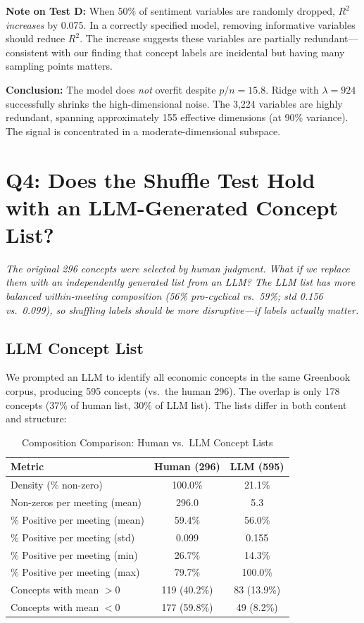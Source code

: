 \documentclass[11pt,a4paper]{article}
\begin{document}
\textbf{Note on Test D:} When 50\% of sentiment variables are randomly dropped, $R^2$ \textit{increases} by 0.075. In a correctly specified model, removing informative variables should reduce $R^2$. The increase suggests these variables are partially redundant---consistent with our finding that concept labels are incidental but having many sampling points matters.

\textbf{Conclusion:} The model does \textit{not} overfit despite $p/n = 15.8$. Ridge with $\lambda = 924$ successfully shrinks the high-dimensional noise. The 3,224 variables are highly redundant, spanning approximately 155 effective dimensions (at 90\% variance). The signal is concentrated in a moderate-dimensional subspace.

\section*{Q4: Does the Shuffle Test Hold with an LLM-Generated Concept List?}

\textit{The original 296 concepts were selected by human judgment. What if we replace them with an independently generated list from an LLM? The LLM list has more balanced within-meeting composition (56\% pro-cyclical vs.\ 59\%; std 0.156 vs.\ 0.099), so shuffling labels should be more disruptive---if labels actually matter.}

\subsection*{LLM Concept List}

We prompted an LLM to identify all economic concepts in the same Greenbook corpus, producing 595 concepts (vs.\ the human 296). The overlap is only 178 concepts (37\% of human list, 30\% of LLM list). The lists differ in both content and structure:

\begin{table}[H]
\centering
\caption{Composition Comparison: Human vs.\ LLM Concept Lists}
\label{tab:composition}
\begin{tabular}{lcc}
\toprule
\textbf{Metric} & \textbf{Human (296)} & \textbf{LLM (595)} \\
\midrule
Density (\% non-zero) & 100.0\% & 21.1\% \\
Non-zeros per meeting (mean) & 296.0 & 5.3 \\
\% Positive per meeting (mean) & 59.4\% & 56.0\% \\
\% Positive per meeting (std) & 0.099 & 0.155 \\
\% Positive per meeting (min) & 26.7\% & 14.3\% \\
\% Positive per meeting (max) & 79.7\% & 100.0\% \\
Concepts with mean $> 0$ & 119 (40.2\%) & 83 (13.9\%) \\
Concepts with mean $< 0$ & 177 (59.8\%) & 49 (8.2\%) \\
\bottomrule
\end{tabular}
\end{table}
\end{document}
